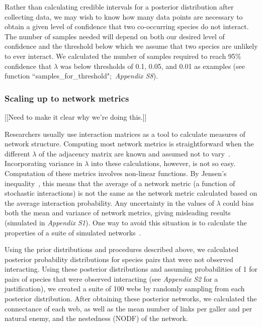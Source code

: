 \documentclass[12pt]{article}
\begin{document}
\begin{spacing}{2.0}
        Rather than calculating credible intervals for a posterior distribution after collecting data, we may wish to know how many data points are necessary to obtain a given level of confidence that two co-occurring species do not interact. The number of samples needed will depend on both our desired level of confidence and the threshold below which we assume that two species are unlikely to ever interact. We calculated the number of samples required to reach 95\% confidence that $\lambda$ was below thresholds of 0.1, 0.05, and 0.01 as examples (see function ``samples\_for\_threshold";~\emph{Appendix S8}).


    \subsubsection*{Scaling up to network metrics}

      [[Need to make it clear why we're doing this.]]

      Researchers usually use interaction matrices as a tool to calculate measures of network structure. Computing most network metrics is straightforward when the different $\lambda$ of the adjacency matrix are known and assumed not to vary~\citep{Poisot2016}. Incorporating variance in $\lambda$ into these calculations, however, is not so easy. Computation of these metrics involves non-linear functions. By Jensen's inequality~\citep{Jensen1906}, this means that the average of a network metric (a function of stochastic interactions) is not the same as the network metric calculated based on the average interaction probability. Any uncertainty in the values of $\lambda$ could bias both the mean and variance of network metrics, giving misleading results (simulated in \emph{Appendix S1}). One way to avoid this situation is to calculate the properties of a suite of simulated networks~\citep{Vazquez2005,Guimera209}.


      Using the prior distributions and procedures described above, we calculated posterior probability distributions for species pairs that were not observed interacting. Using these posterior distributions and assuming probabilities of 1 for pairs of species that were observed interacting (see \emph{Appendix S2} for a justification), we created a suite of 100 webs by randomly sampling from each posterior distribution. After obtaining these posterior networks, we calculated the connectance of each web, as well as the mean number of links per galler and per natural enemy, and the nestedness (NODF) of the network. 



\end{spacing}
\end{document}
